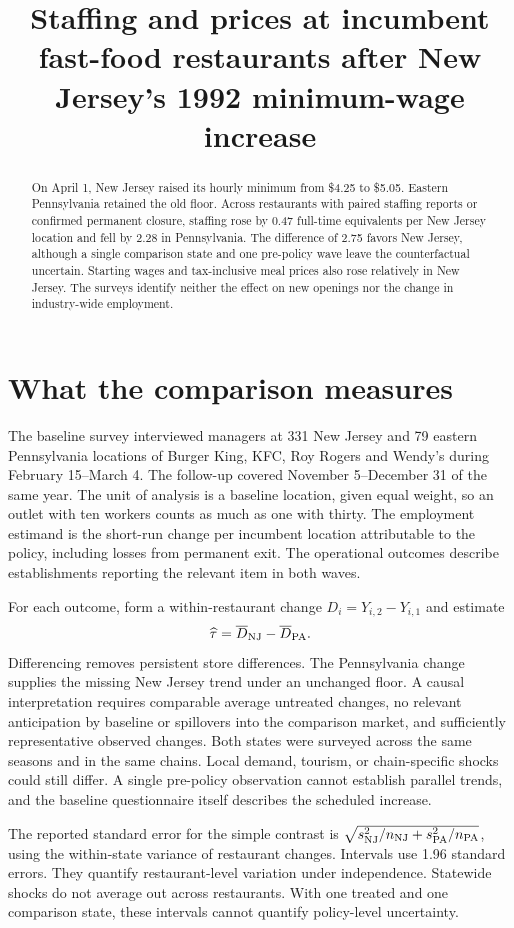 \documentclass[11pt]{article}
\title{Staffing and prices at incumbent fast-food restaurants after New Jersey's 1992 minimum-wage increase}
\author{}
\date{}
\begin{document}
\maketitle
\begin{abstract}
On April 1, New Jersey raised its hourly minimum from \$4.25 to \$5.05. Eastern Pennsylvania retained the old floor. Across restaurants with paired staffing reports or confirmed permanent closure, staffing rose by 0.47 full-time equivalents per New Jersey location and fell by 2.28 in Pennsylvania. The difference of 2.75 favors New Jersey, although a single comparison state and one pre-policy wave leave the counterfactual uncertain. Starting wages and tax-inclusive meal prices also rose relatively in New Jersey. The surveys identify neither the effect on new openings nor the change in industry-wide employment.
\end{abstract}

\section{What the comparison measures}
The baseline survey interviewed managers at 331 New Jersey and 79 eastern Pennsylvania locations of Burger King, KFC, Roy Rogers and Wendy's during February 15--March 4. The follow-up covered November 5--December 31 of the same year. The unit of analysis is a baseline location, given equal weight, so an outlet with ten workers counts as much as one with thirty. The employment estimand is the short-run change per incumbent location attributable to the policy, including losses from permanent exit. The operational outcomes describe establishments reporting the relevant item in both waves.

For each outcome, form a within-restaurant change $D_i=Y_{i,2}-Y_{i,1}$ and estimate
\[
  \widehat\tau=\overline D_{\rm NJ}-\overline D_{\rm PA}.
\]
Differencing removes persistent store differences. The Pennsylvania change supplies the missing New Jersey trend under an unchanged floor. A causal interpretation requires comparable average untreated changes, no relevant anticipation by baseline or spillovers into the comparison market, and sufficiently representative observed changes. Both states were surveyed across the same seasons and in the same chains. Local demand, tourism, or chain-specific shocks could still differ. A single pre-policy observation cannot establish parallel trends, and the baseline questionnaire itself describes the scheduled increase.

The reported standard error for the simple contrast is
$\sqrt{s^2_{\rm NJ}/n_{\rm NJ}+s^2_{\rm PA}/n_{\rm PA}}$, using the within-state variance of restaurant changes. Intervals use 1.96 standard errors. They quantify restaurant-level variation under independence. Statewide shocks do not average out across restaurants. With one treated and one comparison state, these intervals cannot quantify policy-level uncertainty.
\end{document}
